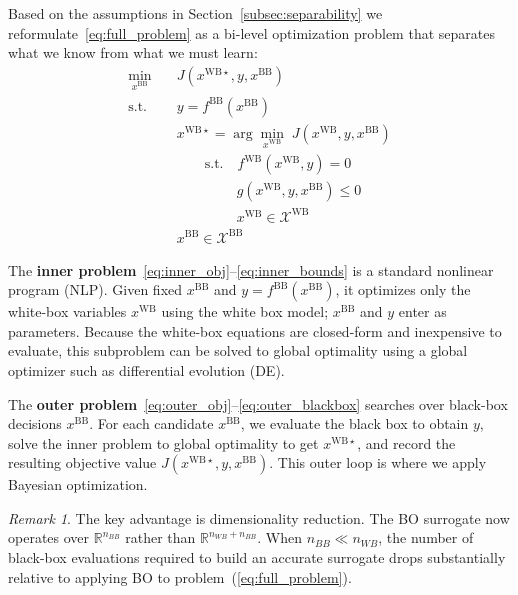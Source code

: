 \documentclass[12pt,a4paper]{article}%
\theoremstyle{plain}%
\theoremstyle{remark}%
\newtheorem{remark}{Remark}%
\theoremstyle{definition}%
\def\WB{\mathrm{WB}}
\def\BB{\mathrm{BB}}
\begin{document}
Based on the assumptions in Section~\ref{subsec:separability} we reformulate~\eqref{eq:full_problem} as a bi-level optimization problem that separates what we know from what we must learn:
\begin{subequations}\label{eq:bilevel}
\begin{align}
    \min_{x^{\BB}} \quad & J(x^{\WB\star}, y, x^{\BB}) \label{eq:outer_obj}\\
    \text{s.t.} \quad & y = f^{\BB}(x^{\BB}) \label{eq:outer_blackbox}\\
    & x^{\WB\star} = \arg\min_{x^{\WB}} \; J(x^{\WB}, y, x^{\BB}) \label{eq:inner_obj}\\
    & \quad\quad \text{s.t.} \quad f^{\WB}(x^{\WB}, y) = 0 \label{eq:inner_process}\\
    & \quad\quad\quad\quad\; g(x^{\WB}, y, x^{\BB}) \leq 0 \label{eq:inner_ineq}\\
    & \quad\quad\quad\quad\; x^{\WB} \in \mathcal{X}^{\WB} \label{eq:inner_bounds}\\
    & x^{\BB} \in \mathcal{X}^{\BB} \label{eq:outer_bounds}
\end{align}
\end{subequations}

The \textbf{inner problem}~\eqref{eq:inner_obj}--\eqref{eq:inner_bounds} is a standard nonlinear program (NLP). Given fixed $x^{\BB}$ and $y = f^{\BB}(x^{\BB})$, it optimizes only the white-box variables $x^{\WB}$ using the white box model; $x^{\BB}$ and $y$ enter as parameters. Because the white-box equations are closed-form and inexpensive to evaluate, this subproblem can be solved to global optimality using a global optimizer such as differential evolution (DE).

The \textbf{outer problem}~\eqref{eq:outer_obj}--\eqref{eq:outer_blackbox} searches over black-box decisions $x^{\BB}$. For each candidate $x^{\BB}$, we evaluate the black box to obtain $y$, solve the inner problem to global optimality to get $x^{\WB\star}$, and record the resulting objective value $J(x^{\WB\star}, y, x^{\BB})$. This outer loop is where we apply Bayesian optimization.

\begin{remark}
The key advantage is dimensionality reduction. The BO surrogate now operates over $\mathbb{R}^{n_{BB}}$ rather than $\mathbb{R}^{n_{WB} + n_{BB}}$. When $n_{BB} \ll n_{WB}$, the number of black-box evaluations required to build an accurate surrogate drops substantially relative to applying BO to problem~(\ref{eq:full_problem}).
\end{remark}
\end{document}
